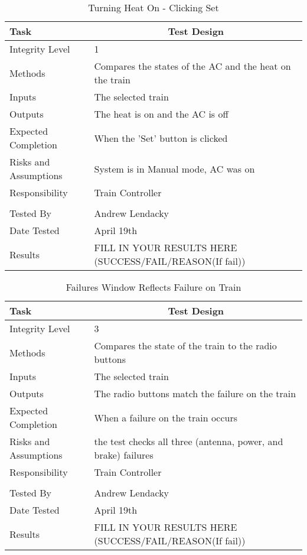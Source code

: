 \documentclass[]{article}
\begin{document}
\begin{table}[H]
	\centering
	\caption{Turning Heat On - Clicking Set}
	\begin{tabular}{|l|l|}
		\hline
		Task & \multicolumn{1}{c|}{Test Design} \\ \hline
		Integrity Level & 1 \\ \hline
		Methods & Compares the states of the AC and the heat on the train\\ \hline
		Inputs & The selected train\\ \hline
		Outputs & The heat is on and the AC is off \\ \hline
		Expected Completion & When the 'Set' button is clicked\\ \hline
		Risks and Assumptions & System is in Manual mode, AC was on \\ \hline
		Responsibility &  Train Controller\\ \hline
			\\ \hline
		Tested By   &  Andrew Lendacky\\	\hline
		Date Tested & \parbox[t]{10cm}{April 19th}\\ \hline
		Results & FILL IN YOUR RESULTS HERE (SUCCESS/FAIL/REASON(If fail))\\ \hline
	\end{tabular}
\end{table}

\begin{table}[H]
	\centering
	\caption{Failures Window Reflects Failure on Train}
	\begin{tabular}{|l|l|}
		\hline
		Task & \multicolumn{1}{c|}{Test Design} \\ \hline
		Integrity Level & 3 \\ \hline
		Methods & Compares the state of the train to the radio buttons\\ \hline
		Inputs & The selected train\\ \hline
		Outputs & The radio buttons match the failure on the train\\ \hline
		Expected Completion & When a failure on the train occurs\\ \hline
		Risks and Assumptions & the test checks all three (antenna, power, and brake) failures \\ \hline
		Responsibility & Train Controller\\ \hline
			\\ \hline
		Tested By   &  Andrew Lendacky\\	\hline
		Date Tested & \parbox[t]{10cm}{April 19th}\\ \hline
		Results & FILL IN YOUR RESULTS HERE (SUCCESS/FAIL/REASON(If fail))\\ \hline
	\end{tabular}
\end{table}
\end{document}
